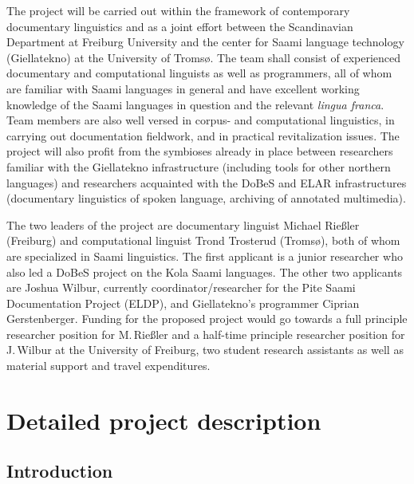 \documentclass[a4paper,12pt]{article}
\begin{document}
The project will be carried out within the framework of contemporary documentary linguistics and as a joint effort between the Scandinavian Department at Freiburg University and the center for Saami language technology (Giellatekno) at the University of Tromsø.
The team shall consist of experienced documentary and computational linguists as well as programmers, all of whom are familiar with Saami languages in general and have excellent working knowledge of the Saami languages in question and the relevant \textit{lingua franca}. Team members are also well versed in corpus- and computational linguistics, in carrying out documentation fieldwork, and in practical revitalization issues. The project will also profit from the symbioses already in place between researchers familiar with the Giellatekno infrastructure (including tools for other northern languages) and researchers acquainted with the DoBeS and ELAR infrastructures (documentary linguistics of spoken language, archiving of annotated multimedia).

The two leaders of the project are documentary linguist Michael Rießler (Freiburg) and computational linguist Trond Trosterud (Tromsø), both of whom are specialized in Saami linguistics. The first applicant is a junior researcher who also led a DoBeS project on the Kola Saami languages. The other two applicants are Joshua Wilbur, currently coordinator/researcher for the Pite Saami Documentation Project (ELDP), and Giellatekno's programmer Ciprian Gerstenberger. Funding for the proposed project would go towards a full principle researcher position for M.\,Rießler and a half-time principle researcher position for J.\,Wilbur at the University of Freiburg, two student research assistants as well as material support and travel expenditures.


\section{Detailed project description}%
\subsection{Introduction}
\end{document}
